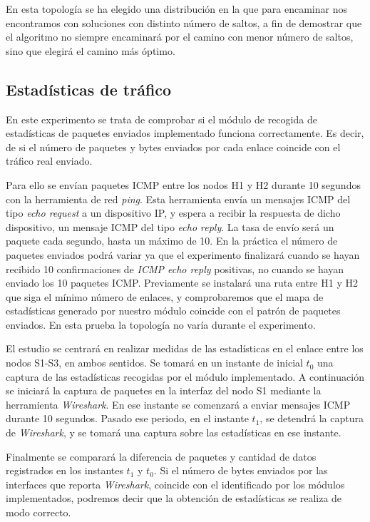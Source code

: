 \documentclass[a4paper,11pt]{book}
\begin{document}
En esta topología se ha elegido una distribución en la que para encaminar nos encontramos con soluciones con distinto número de saltos, a fin de demostrar que el algoritmo no siempre encaminará por el camino con menor número de saltos, sino que elegirá el camino más óptimo.


%
\subsection{Estadísticas de tráfico} 

 En este experimento se trata de comprobar si el módulo de recogida de estadísticas de paquetes enviados implementado funciona correctamente. Es decir, de si el número de paquetes y bytes enviados por cada enlace coincide con el tráfico real enviado.
 
 Para ello se envían paquetes \ac{ICMP} entre los nodos H1 y H2 durante 10 segundos con la herramienta de red \emph{ping}. Esta herramienta envía un mensajes \ac{ICMP} del tipo \emph{echo request} a un dispositivo IP, y espera a recibir la respuesta de dicho dispositivo, un mensaje \ac{ICMP} del tipo \emph{echo reply}. La tasa de envío será un paquete cada segundo, hasta un máximo de 10. En la práctica el número de paquetes enviados podrá variar ya que el experimento finalizará cuando se hayan recibido 10 confirmaciones de \emph{ICMP echo reply} positivas, no cuando se hayan enviado los 10 paquetes \ac{ICMP}.   Previamente se instalará una ruta entre H1 y H2 que siga el mínimo número de enlaces, y comprobaremos que el mapa de estadísticas generado por nuestro módulo coincide con el patrón de paquetes enviados. En esta prueba la topología no varía durante el experimento.

 El estudio se centrará en realizar medidas de las estadísticas en el enlace entre los nodos S1-S3, en ambos sentidos. Se tomará en un instante de inicial $t_{0}$ una captura de las estadísticas recogidas por el módulo implementado. A continuación se iniciará la captura de paquetes en la interfaz del nodo S1 mediante la herramienta \emph{Wireshark}.  En ese instante se comenzará a enviar mensajes \ac{ICMP} durante 10 segundos. Pasado ese periodo, en el instante $t_{1}$, se detendrá la captura de \emph{Wireshark}, y se tomará una captura sobre las estadísticas en ese instante.
 
  Finalmente se comparará la diferencia de paquetes y cantidad de datos registrados en los instantes $t_{1}$ y $t_{0}$. Si el número de bytes enviados por las interfaces que reporta \emph{Wireshark}, coincide con el identificado por los módulos implementados, podremos decir que la obtención de estadísticas se realiza de modo correcto.
  
\end{document}
